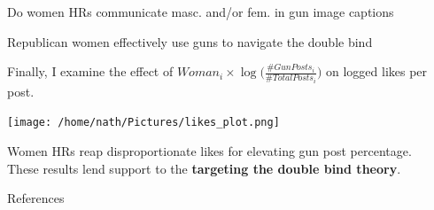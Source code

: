\documentclass[final]{beamer}
\newlength{\sepwidth}
\newlength{\colwidth}
\newcommand{\separatorcolumn}{\begin{column}{\sepwidth}\end{column}}
\begin{document}
\begin{frame}[t]
\begin{columns}[t]
\begin{column}{\colwidth}
\begin{block}{Do women HRs communicate masc. and/or fem. in gun image captions}
\end{block}

\begin{block}{Republican women effectively use guns to navigate the double bind}

Finally, I examine the effect of $\textit{Woman}_i \times \log\bigg(\frac{\#\textit{GunPosts}_i}{\#\textit{TotalPosts}_i}\bigg)$ on logged likes per post. %

\begin{center}
\texttt{[image: /home/nath/Pictures/likes\_plot.png]}
\end{center}

Women HRs reap disproportionate likes for elevating gun post percentage. These results lend support to the \textbf{targeting the double bind theory}. %

\end{block}


\begin{block}{References}
\nocite{*}
\scriptsize{}  
\end{block}

\end{column}

\separatorcolumn
\end{columns}
\end{frame}
\end{document}
